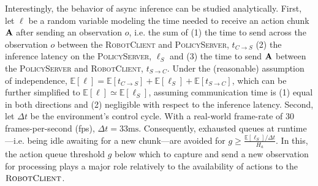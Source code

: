 Interestingly, the behavior of async inference can be studied analytically. First, let \( \ell \) be a random variable modeling the time needed to receive an action chunk \( \mathbf{A} \) after sending an observation \( o \), i.e. the sum of (1) the time to send across the observation \( o \) between the \textsc{RobotClient} and \textsc{PolicyServer}, \( t_{C \to S}\) (2) the inference latency on the \textsc{PolicyServer}, \( \ell_S \) and (3) the time to send \( \mathbf{A} \) between the \textsc{PolicyServer} and \textsc{RobotClient}, \( t_{S \to C} \). Under the (reasonable) assumption of independence, \( \mathbb E [\ell] = \mathbb E[t_{C \to S}] + \mathbb E[\ell_S] + \mathbb E[t_{S \to C}] \), which can be further simplified to \( \mathbb E[\ell] \simeq \mathbb E[\ell_S]  \), assuming communication time is (1) equal in both directions and (2) negligible with respect to the inference latency. Second, let \(\Delta t\) be the environment's control cycle. With a real-world frame-rate of 30 frames-per-second (fps), \(\Delta t=33\text{ms}\). Consequently, exhausted queues at runtime---i.e. being idle awaiting for a new chunk---are avoided for \( g \geq \frac{\mathbb E[\ell_S] / \Delta t}{H_a} \). In this, the action queue threshold \( g \) below which to capture and send a new observation for processing plays a major role relatively to the availability of actions to the \( \textsc{RobotClient} \).

